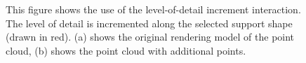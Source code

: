 \begin{figure}
\centering
{}
\caption[Example of the local increment of level of detail]
{This figure shows the use of the level-of-detail increment interaction. The level of detail is incremented along the selected support shape (drawn in red). (a) shows the original rendering model of the point cloud, (b) shows the point cloud with additional points. }
\label{fig:technologiezentrum_lod_increment}
\end{figure}


